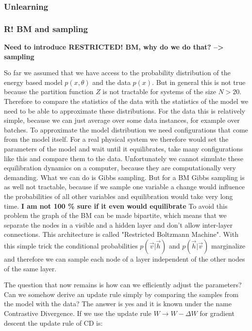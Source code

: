 \documentclass[nofootinbib, superscriptaddress, prl]{revtex4}
\begin{document}
\subsubsection{Unlearning}

\subsubsection{R! BM and sampling}

 \textbf{Need to introduce RESTRICTED! BM, why do we do that? --> sampling}

So far we assumed that we have access to the probability distribution of the energy based model $p(x, \theta)$ and the data $p(x)$. But in general this is not true because the partition function $Z$ is not tractable for systems of the size $N>20$. Therefore to compare the statistics of the data with the statistics of the model we need to be able to approximate these distributions. For the data this is relatively simple, because we can just average over some data instances, for example over batches. To approximate the model distribution we need configurations that come from the model itself. For a real physical system we therefore would set the parameters of the model and wait until it equilibrates, take many configurations like this and compare them to the data. 
Unfortunately we cannot simulate these equilibration dynamics on a computer, because they are computationally very demanding. What we can do is Gibbs sampling. But for a BM Gibbs sampling is as well not tractable, because if we sample one variable a change would influence the probabilities of all other variables and equilibration would take very long time. \textbf{I am not 100 \% sure if it even would equilibrate} To avoid this problem the graph of the BM can be made bipartite, which means that we separate the nodes in a visible and a hidden layer and don't allow inter-layer connections. This architecture is called "Restricted Boltzmann Machine". With this simple trick the conditional probabilities $p(\vec{v}|\vec{h})$ and $p(\vec{h}|\vec{v})$ marginalize and therefore we can sample each node of a layer independent of the other nodes of the same layer. 

The question that now remains is how can we efficiently adjust the parameters? Can we somehow derive an update rule simply by comparing the samples from the model with the data? The answer is yes and it is known under the name Contrastive Divergence. If we use the update rule $W \rightarrow W - \Delta W$ for gradient descent the update rule of CD is:
\end{document}
